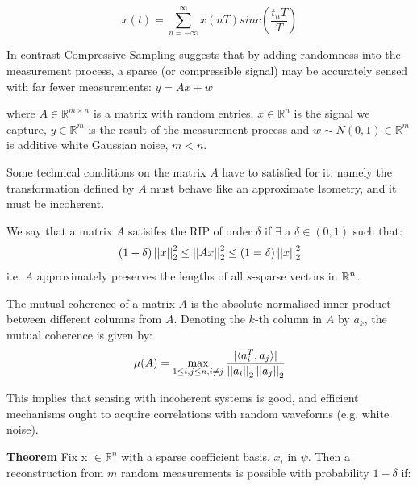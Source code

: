 \documentclass{article}
\begin{document}
\begin{equation}
x\left(t\right) = \sum_{n=-\infty}^\infty x\left(nT\right) sinc\left(\frac{t_nT}{T}\right)
\end{equation}

In contrast Compressive Sampling suggests that by adding randomness into the measurement process, a sparse (or compressible signal) may be accurately sensed with far fewer measurements:
$y = Ax + w$

where \(A \in \mathbb{R}^{m \times n}\) is a matrix with random entries, \(x \in \mathbb{R}^n\) is the signal we capture, \(y \in \mathbb{R}^m\) is the result of the measurement process and \(w \sim N\left(0,1\right) \in \mathbb{R}^m\) is additive white Gaussian noise, \(m < n\).

Some technical conditions on the matrix \(A\) have to satisfied for it: namely the transformation defined by \(A\) must behave like an approximate Isometry, and it must be incoherent.

\begin{definition}[RIP]
We say that a matrix \(A\) satisifes the RIP of order \(\delta\) if \(\exists\) a \(\delta \in \left(0, 1\right)\) such that:
\begin{equation}
\left(1 - \delta\right) \left|\left|x\right|\right|_2^2 \leq \left|\left|Ax\right|\right|_2^2 \leq \left(1 = \delta\right) \left|\left|x\right|\right|_2^2
\end{equation}
i.e. \(A\) approximately preserves the lengths of all \(s\)-sparse vectors in \({\mathbb{R}}^n\). 
\end{definition}

\begin{definition}[Coherence]
The mutual coherence of a matrix \(A\) is the absolute normalised inner product between different columns from \(A\). Denoting the \(k\)-th column in \(A\) by \(a_k\), the mutual coherence is given by:
\begin{equation}
\mu(A) = \max_{1\leq i,j\leq n , i\neq j} \frac{|\langle a^T_i, a_j\rangle|}{\left|\left|a_i\right|\right|_2\left|\left|a_j\right|\right|_2}
\end{equation}
\end{definition}

This implies that sensing with incoherent systems is good, and efficient mechanisms ought to acquire correlations with random waveforms (e.g. white noise).

\textbf{Theorem} \cite{Candes2006}
Fix x \(\in \mathbb{R}^n\) with a sparse coefficient basis, \(x_{i}\) in \(\psi\). Then a reconstruction from \(m\) random measurements is possible with probability \(1 - \delta\) if: 
\end{document}
